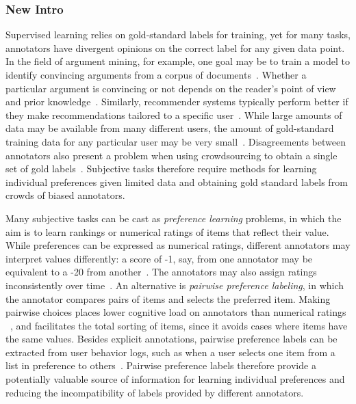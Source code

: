 \subsubsection*{New Intro}

Supervised learning relies on gold-standard labels for training, 
yet for many tasks, annotators have divergent opinions on the correct label
for any given data point.
In the field of argument mining, for example, one goal may be to train a model to 
identify convincing arguments from a corpus of documents~\citep{habernal2016argument}. 
Whether a particular argument is convincing or not depends on the reader's point of view and prior knowledge~\citep{lukin2017argument}.
Similarly, recommender systems typically perform better if they make recommendations tailored
to a specific user~\citep{??}.
While large amounts of data may be available from
many different users, the amount of gold-standard training data for any particular user
may be very small~\citep{?}.
Disagreements between annotators also present a problem when using crowdsourcing to 
obtain a single set of gold labels~\citep{?}.
Subjective tasks therefore require methods for learning individual preferences given 
limited data and obtaining gold standard labels from crowds of biased annotators.

Many subjective tasks can be cast as \emph{preference learning} problems,
in which the aim is to learn rankings or numerical ratings of items that reflect their value.
While preferences can be expressed as numerical ratings,
different annotators may interpret values differently: 
a score of -1, say, from one annotator may be equivalent to a -20 from another~\cite{?}. 
The annotators may also assign ratings inconsistently
over time~\cite{?}. 
An alternative is \emph{pairwise preference labeling}, 
in which the annotator compares pairs of items and selects the preferred item.
Making pairwise choices places lower cognitive load on annotators than numerical ratings ~\citep{kendall1948rank,kingsley2010},
and facilitates the total sorting of items, since it avoids cases where items have the same values.
Besides explicit annotations, pairwise preference labels can be extracted from
user behavior logs, such as when a user selects one item from a list in preference
to others~\cite{}. 
Pairwise preference labels therefore provide a potentially valuable
source of information for learning individual preferences and reducing 
the incompatibility of labels provided by different annotators.

